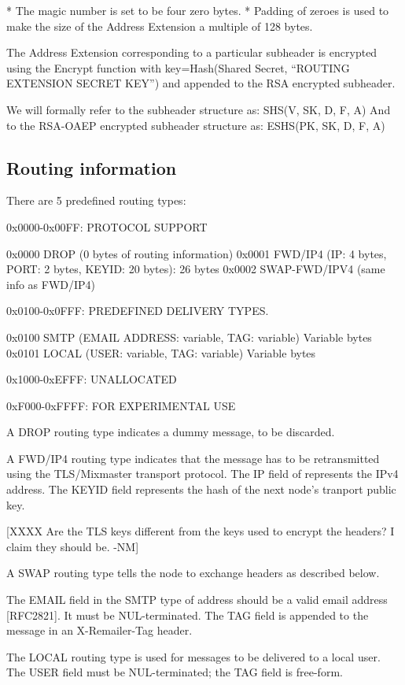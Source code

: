* The magic number is set to be four zero bytes.
* Padding of zeroes is used to make the size of the Address Extension a
multiple of 128 bytes.  

The Address Extension corresponding to a particular subheader is
encrypted using the Encrypt function with key=Hash(Shared Secret,
``ROUTING EXTENSION SECRET KEY'') and appended to the RSA encrypted
subheader.

We will formally refer to the subheader structure as:
SHS(V, SK, D, F, A)
And to the RSA-OAEP encrypted subheader structure as:
ESHS(PK, SK, D, F, A)

\subsection{Routing information}

There are 5 predefined routing types:

0x0000-0x00FF: PROTOCOL SUPPORT

0x0000 DROP    (0 bytes of routing information)
0x0001 FWD/IP4 (IP: 4 bytes, PORT: 2 bytes, KEYID: 20 bytes): 26 bytes
0x0002 SWAP-FWD/IPV4 (same info as FWD/IP4)

0x0100-0x0FFF: PREDEFINED DELIVERY TYPES.

0x0100 SMTP   (EMAIL ADDRESS: variable, TAG: variable) Variable bytes
0x0101 LOCAL  (USER: variable, TAG: variable) Variable bytes

0x1000-0xEFFF: UNALLOCATED

0xF000-0xFFFF: FOR EXPERIMENTAL USE

A DROP routing type indicates a dummy message, to be discarded.

A FWD/IP4 routing type indicates that the message has to be
retransmitted using the TLS/Mixmaster transport protocol. The IP field
of represents the IPv4 address.  The KEYID field represents the hash of
the next node's tranport public key.

[XXXX Are the TLS keys different from the keys used to encrypt the
      headers?  I claim they should be. -NM]

A SWAP routing type tells the node to exchange headers as described below.

The EMAIL field in the SMTP type of address should be a valid email
address [RFC2821].  It must be NUL-terminated.  The TAG field is
appended to the message in an X-Remailer-Tag header.

The LOCAL routing type is used for messages to be delivered to a local
user.  The USER field must be NUL-terminated; the TAG field is
free-form.

